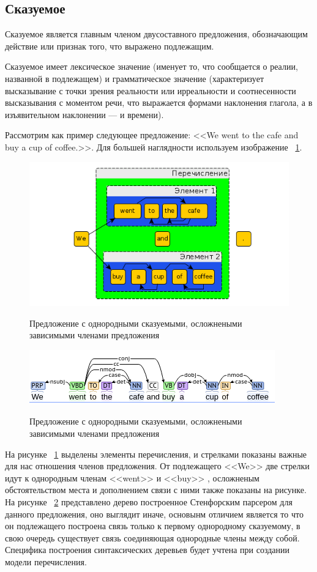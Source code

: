 \documentclass{standalone}
\begin{document}
\subsection{Сказуемое} %
% 
\par Сказуемое является главным членом двусоставного предложения, обозначающим действие или признак того, что выражено подлежащим.
\par Сказуемое имеет лексическое значение (именует то, что сообщается о реалии, названной в подлежащем) и грамматическое значение (характеризует высказывание с точки зрения реальности или ирреальности и соотнесенности высказывания с моментом речи, что выражается формами наклонения глагола, а в изъявительном наклонении — и времени).
\par Рассмотрим как пример следующее предложение: <<We went to the cafe and buy a cup of coffee.>>. Для большей наглядности используем изображение ~\ref{skazuemoe}.
\begin{figure}
\includegraphics[width=\textwidth]{images/sentences2.png}
\label{skazuemoe}
\caption{Предложение с однородными сказуемыми, осложнеными зависимыми членами предложения}
\end{figure}
\begin{figure}
    \includegraphics[width=\textwidth]{images/sentences21.png}
\label{skazuemoe2}
\caption{Предложение с однородными сказуемыми, осложнеными зависимыми членами предложения}
\end{figure}
\par На рисунке ~\ref{skazuemoe} выделены элементы перечисления, и стрелками показаны важные для нас отношения членов предложения. От подлежащего <<We>> две стрелки идут к однородным членам <<went>>  и <<buy>> , осложненым обстоятельством места и дополнением связи с ними также показаны на рисунке. На рисунке ~\ref{skazuemoe2} представлено дерево построенное Стенфорским парсером для данного предложения, оно выглядит иначе, основынм отличием является то что он подлежащего построена связь только к первому однородному сказуемому, в свою очередь существует связь соединяющая однородные члены между собой. Специфика построения синтаксических деревьев будет учтена при создании модели перечисления.
\end{document}
